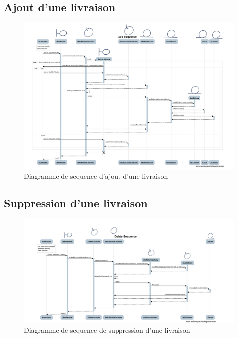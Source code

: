 \begin{landscape}
    \subsection{Ajout d'une livraison}

    \begin{figure}[h]
        \centering
        \includegraphics[width=0.7\linewidth]{../diagrams/sequences/addsequence.png}
        \caption{Diagramme de sequence d'ajout d'une livraison}
        \label{diagram:seq_add_delivery}
    \end{figure}
\end{landscape}
\pagebreak

\begin{landscape}
    \subsection{Suppression d'une livraison}

    \begin{figure}[h]
        \centering
        \includegraphics[width=170mm]{../diagrams/sequences/delsequence.png}
        \caption{Diagramme de sequence de suppression d'une livraison}
        \label{diagram:seq_del_delivery}
    \end{figure}
\end{landscape}
\pagebreak

